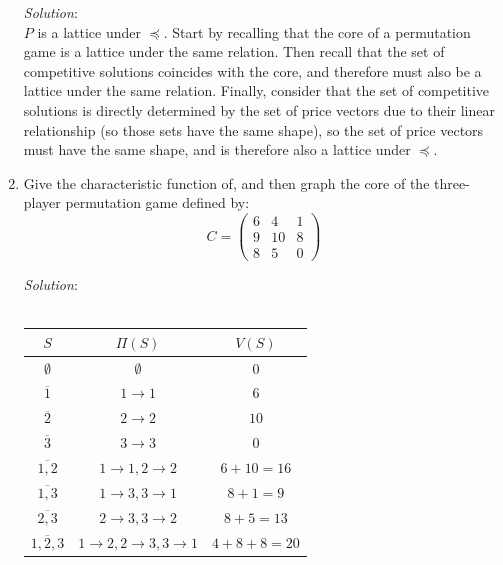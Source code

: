 \documentclass{article}
\begin{document}
\begin{enumerate}
\textit{Solution}: \\
$P$ is a lattice under $\preceq$. Start by recalling that the core of a permutation game is a lattice under the same relation. Then recall that the set of competitive solutions coincides with the core, and therefore must also be a lattice under the same relation. Finally, consider that the set of competitive solutions is directly determined by the set of price vectors due to their linear relationship (so those sets have the same shape), so the set of price vectors must have the same shape, and is therefore also a lattice under $\preceq$.

%
\newpage
\item Give the characteristic function of, and then graph the core of the three-player permutation game defined by:
\[
C = \begin{pmatrix}
 6 &  4 &  1 \\
 9 & 10 &  8 \\
 8 &  5 &  0
\end{pmatrix}
\]

\textit{Solution}: \\\\
\begin{tabular}{| c | c | c |}
\hline
$S$                  & $\Pi(S)$                                            & $V(S)$           \\
\hline\hline
$\emptyset$          & $\emptyset$                                         & $0$              \\
\hline
$\overline{1}$       & $1 \rightarrow 1$                                   & $6$              \\
\hline
$\overline{2}$       & $2 \rightarrow 2$                                   & $10$             \\
\hline
$\overline{3}$       & $3 \rightarrow 3$                                   & $0$              \\
\hline
$\overline{1, 2}$    & $1 \rightarrow 1, 2 \rightarrow 2$                  & $6 + 10 = 16$    \\
\hline
$\overline{1, 3}$    & $1 \rightarrow 3, 3 \rightarrow 1$                  & $8 + 1 = 9$      \\
\hline
$\overline{2, 3}$    & $2 \rightarrow 3, 3 \rightarrow 2$                  & $8 + 5 = 13$     \\
\hline
$\overline{1, 2, 3}$ & $1 \rightarrow 2, 2 \rightarrow 3, 3 \rightarrow 1$ & $4 + 8 + 8 = 20$ \\
\hline
\end{tabular}


\end{enumerate}
\end{document}
